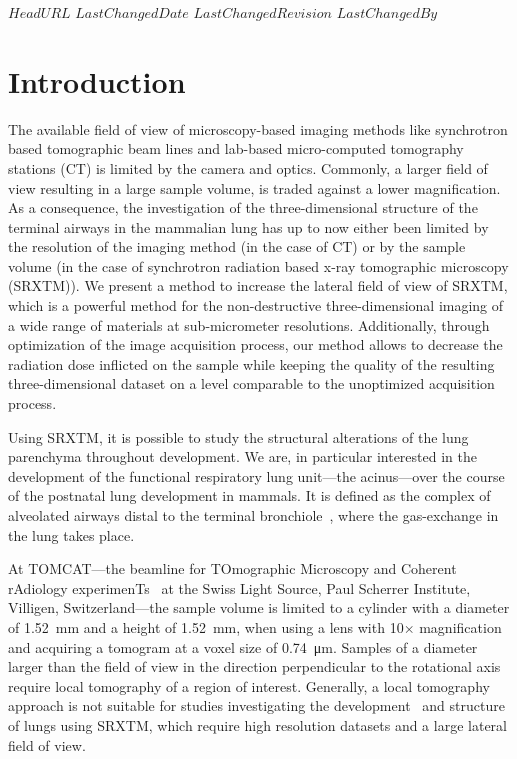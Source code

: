 \svnidlong
{$HeadURL$}
{$LastChangedDate$}
{$LastChangedRevision$}
{$LastChangedBy$}
%
\section{Introduction}

The available field of view of microscopy-based imaging methods like synchrotron based tomographic beam lines and lab-based micro-computed tomography stations (\micro CT) is limited by the camera and optics. Commonly, a larger field of view resulting in a large sample volume, is traded against a lower magnification. As a consequence, the investigation of the three-dimensional structure of the terminal airways in the mammalian lung has up to now either been limited by the resolution of the imaging method (in the case of \micro CT) or by the sample volume (in the case of synchrotron radiation based x-ray tomographic microscopy (SRXTM)). We present a method to increase the lateral field of view of SRXTM, which is a powerful method for the non-destructive three-dimensional imaging of a wide range of materials at sub-micrometer resolutions. Additionally, through optimization of the image acquisition process, our method allows to decrease the radiation dose inflicted on the sample while keeping the quality of the resulting three-dimensional dataset on a level comparable to the unoptimized acquisition process.

Using SRXTM, it is possible to study the structural alterations of the lung parenchyma throughout development. We are, in particular interested in the development of the functional respiratory lung unit---the acinus---over the course of the postnatal lung development in mammals. It is defined as the complex of alveolated airways distal to the terminal bronchiole~\cite{Rodriguez1987}, where the gas-exchange in the lung takes place.

At TOMCAT---the beamline for TOmographic Microscopy and Coherent rAdiology experimenTs~\cite{Stampanoni2007} at the Swiss Light Source, Paul Scherrer Institute, Villigen, Switzerland---the sample volume is limited to a cylinder with a diameter of \SI{1.52}{\milli\meter} and a height of \SI{1.52}{\milli\meter}, when using a lens with 10$\times$ magnification and acquiring a tomogram at a voxel size of \SI{0.74}{\micro\meter}. Samples of a diameter larger than the field of view in the direction perpendicular to the rotational axis require local tomography of a region of interest. Generally, a local tomography approach is not suitable for studies investigating the development~\cite{Schittny2008,Mund2008,Haberthuer2009c} and structure~\cite{Tsuda2008} of lungs using SRXTM, which require high resolution datasets and a large lateral field of view.

